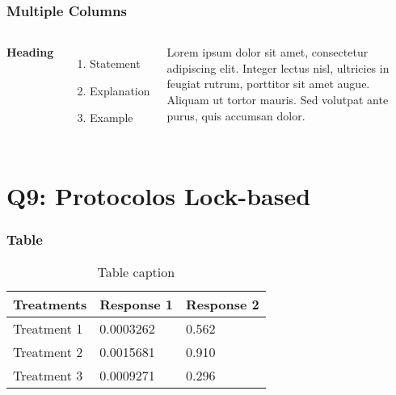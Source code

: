 \documentclass{beamer}
\begin{document}


\begin{frame}
\frametitle{Multiple Columns}
\begin{columns}[c] %

\textbf{Heading}
\begin{enumerate}
\item Statement
\item Explanation
\item Example
\end{enumerate}

Lorem ipsum dolor sit amet, consectetur adipiscing elit. Integer lectus nisl, ultricies in feugiat rutrum, porttitor sit amet augue. Aliquam ut tortor mauris. Sed volutpat ante purus, quis accumsan dolor.

\end{columns}
\end{frame}

\section{Q9: Protocolos Lock-based}

\begin{frame}
\frametitle{Table}
\begin{table}
\begin{tabular}{l l l}
\toprule
\textbf{Treatments} & \textbf{Response 1} & \textbf{Response 2}\\
\midrule
Treatment 1 & 0.0003262 & 0.562 \\
Treatment 2 & 0.0015681 & 0.910 \\
Treatment 3 & 0.0009271 & 0.296 \\
\bottomrule
\end{tabular}
\caption{Table caption}
\end{table}
\end{frame}
\end{document}
